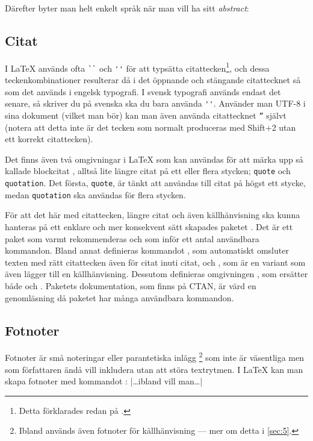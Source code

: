 \documentclass[10pt,../../a4.tex]{subfiles}
\begin{document}
	Därefter byter man helt enkelt språk när man vill ha sitt \emph{abstract}:
\begin{latexcode}
\begin{otherlanguage}{english}
\begin{abstract}
\end{abstract}
\end{otherlanguage}
\begin{abstract}
\end{abstract}
\end{latexcode}

\subsection{Citat}\label{sec:2:citat}
I \LaTeX{} används ofta \verb|``| och \verb|''| för att typsätta citattecken\footnote{Detta förklarades redan på .},
och dessa teckenkombinationer resulterar då i det öppnande och stängande
citattecknet så som det används i engelsk typografi. I svensk typografi
används endast det senare, så skriver du på svenska ska du bara använda
\verb|''|. Använder man UTF-8 i sina dokument (vilket man bör) kan man
även använda citattecknet \verb|”| självt (notera att detta inte är det
tecken som normalt produceras med Shift+2 utan ett korrekt citattecken).

Det finns även två omgivningar i \LaTeX{} som kan användas för att märka upp
så kallade blockcitat , alltså lite längre citat på ett
eller flera stycken; \texttt{quote} och \texttt{quotation}. Det första,
\texttt{quote}, är tänkt att användas till citat på högst ett stycke,
medan \texttt{quotation} ska användas för flera stycken.

För att det här med citattecken, längre citat och även källhänvisning ska
kunna hanteras på ett enklare och mer konsekvent sätt skapades paketet
. Det är ett paket som varmt rekommenderas och som inför
ett antal användbara kommandon. Bland annat definieras kommandot
, som automatiskt omsluter texten med rätt citattecken även
för citat inuti citat, och
, som är en variant som även lägger till en källhänvisning.
Dessutom definieras omgivningen , som ersätter både
 och . Paketets dokumentation, som finns på CTAN,
är värd en genomläsning då paketet har många användbara kommandon.

\subsection{Fotnoter}\label{sec:2:footnote}
Fotnoter är små noteringar eller parantetiska inlägg%
\footnote{Ibland används även fotnoter för källhänvisning — mer om detta
i \cref{sec:5}.} som inte är väsentliga men som författaren ändå
vill inkludera utan att störa textrytmen. I \LaTeX{} kan man skapa 
fotnoter med kommandot :
\latex|\ldots{}ibland vill man\ldots|
\end{document}
